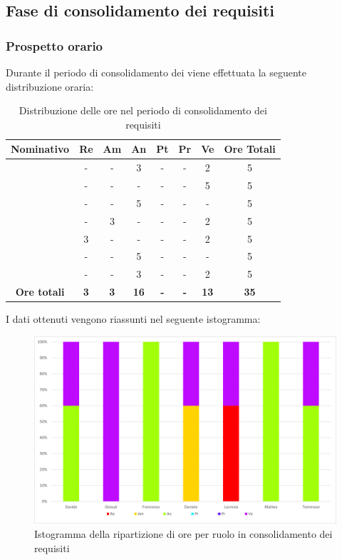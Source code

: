 \subsection{Fase di consolidamento dei requisiti}
\subsubsection{Prospetto orario}
Durante il periodo di consolidamento dei  viene effettuata la seguente distribuzione oraria:
\begin{table}[H]
		\begin{center}
			\setlength{\aboverulesep}{0pt}
			\setlength{\belowrulesep}{0pt}
			\setlength{\extrarowheight}{.75ex}
			\begin{tabular}{ c c c c c c c c }
				\rowcolor{AzzurroGruppo!30} 
				\textbf{Nominativo} & \textbf{Re} & \textbf{Am} & \textbf{An} & \textbf{Pt} & \textbf{Pr} & \textbf{Ve} & \textbf{Ore Totali}  \\
				\toprule
				\Davide    & - & - & 3 & - & - & 2 & 5 \\
				\Giosue    & - & - & - & - & - & 5 & 5 \\
				\Francesco & - & - & 5 & - & - & - & 5\\
				\Daniele   & - & 3 & - & - & - & 2 & 5\\
				\Lucrezia  & 3 & - & - & - & - & 2 & 5\\
				\Matteo    & - & - & 5 & - & - & - & 5\\
				\Tommaso    & - & - & 3 & - & - & 2 & 5\\
				 \textbf{Ore totali} & \textbf{3} & \textbf{3} & \textbf{16} & \textbf{-} & \textbf{-} & \textbf{13} & \textbf{35} \\
				\bottomrule
			\end{tabular}
			\caption{Distribuzione delle ore nel periodo di consolidamento dei requisiti}
		\end{center}
	\end{table}
I dati ottenuti vengono riassunti nel seguente istogramma:
\begin{figure}[H]
    \centering
    \includegraphics[scale = 0.5]{components/img/Analisi-consolidamento-isto.png}
    \caption{Istogramma della ripartizione di ore per ruolo in consolidamento dei requisiti}
    \label{fig:Istogramma ripartizione ore , fase di consolidamento dei requisiti}
\end{figure}
